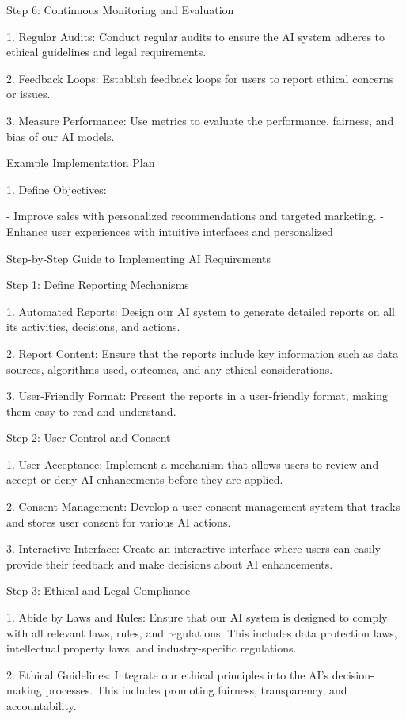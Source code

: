 \documentclass[12pt,letterpaper]{article}
\begin{document}
Step 6: Continuous Monitoring and Evaluation

1. Regular Audits: Conduct regular audits to ensure the AI system adheres to ethical guidelines and legal requirements.

2. Feedback Loops: Establish feedback loops for users to report ethical concerns or issues.

3. Measure Performance: Use metrics to evaluate the performance, fairness, and bias of our AI models.

 Example Implementation Plan

1. Define Objectives:

- Improve sales with personalized recommendations and targeted marketing.
- Enhance user experiences with intuitive interfaces and personalized

 Step-by-Step Guide to Implementing AI Requirements

 Step 1: Define Reporting Mechanisms

1. Automated Reports: Design our AI system to generate detailed reports on all its activities, decisions, and actions.

2. Report Content: Ensure that the reports include key information such as data sources, algorithms used, outcomes, and any ethical considerations.

3. User-Friendly Format: Present the reports in a user-friendly format, making them easy to read and understand.

 Step 2: User Control and Consent

1. User Acceptance: Implement a mechanism that allows users to review and accept or deny AI enhancements before they are applied.

2. Consent Management: Develop a user consent management system that tracks and stores user consent for various AI actions.

3. Interactive Interface: Create an interactive interface where users can easily provide their feedback and make decisions about AI enhancements.

 Step 3: Ethical and Legal Compliance

1. Abide by Laws and Rules: Ensure that our AI system is designed to comply with all relevant laws, rules, and regulations. This includes data protection laws, intellectual property laws, and industry-specific regulations.

2. Ethical Guidelines: Integrate our ethical principles into the AI's decision-making processes. This includes promoting fairness, transparency, and accountability.
\end{document}
